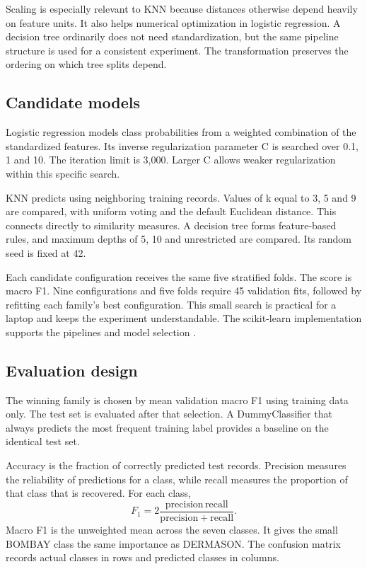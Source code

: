 \documentclass[conference]{IEEEtran}
\begin{document}
Scaling is especially relevant to KNN because distances otherwise depend heavily on feature units. It also helps numerical optimization in logistic regression. A decision tree ordinarily does not need standardization, but the same pipeline structure is used for a consistent experiment. The transformation preserves the ordering on which tree splits depend.
\subsection{Candidate models}
Logistic regression models class probabilities from a weighted combination of the standardized features. Its inverse regularization parameter C is searched over 0.1, 1 and 10. The iteration limit is 3,000. Larger C allows weaker regularization within this specific search.

KNN predicts using neighboring training records. Values of k equal to 3, 5 and 9 are compared, with uniform voting and the default Euclidean distance. This connects directly to similarity measures. A decision tree forms feature-based rules, and maximum depths of 5, 10 and unrestricted are compared. Its random seed is fixed at 42.

Each candidate configuration receives the same five stratified folds. The score is macro F1. Nine configurations and five folds require 45 validation fits, followed by refitting each family's best configuration. This small search is practical for a laptop and keeps the experiment understandable. The scikit-learn implementation supports the pipelines and model selection \cite{sklearn}.
\subsection{Evaluation design}
The winning family is chosen by mean validation macro F1 using training data only. The test set is evaluated after that selection. A DummyClassifier that always predicts the most frequent training label provides a baseline on the identical test set.

Accuracy is the fraction of correctly predicted test records. Precision measures the reliability of predictions for a class, while recall measures the proportion of that class that is recovered. For each class,
\begin{equation}F_1=2\frac{\mathrm{precision}\,\mathrm{recall}}{\mathrm{precision}+\mathrm{recall}}.\end{equation}
Macro F1 is the unweighted mean across the seven classes. It gives the small BOMBAY class the same importance as DERMASON. The confusion matrix records actual classes in rows and predicted classes in columns.
\end{document}
